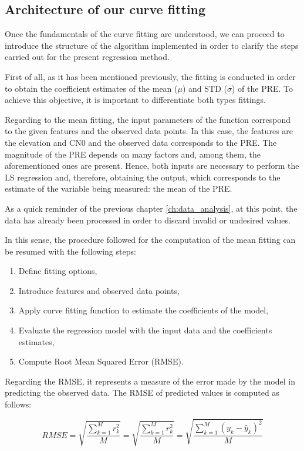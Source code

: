\documentclass[a4paper, report, oneside, UKenglish]{memoir}
\begin{document}
\subsection{Architecture of our curve fitting}

Once the fundamentals of the curve fitting are understood, we can proceed to introduce the structure of the algorithm implemented in order to clarify the steps carried out for the present regression method.

First of all, as it has been mentioned previously, the fitting is conducted in order to obtain the coefficient estimates of the mean ($\mu$) and STD ($\sigma$) of the PRE. To achieve this objective, it is important to differentiate both types fittings. 

Regarding to the mean fitting, the input parameters of the function correspond to the given features and the observed data points. In this case, the features are the elevation and CN0 and the observed data corresponds to the PRE. The magnitude of the PRE depends on many factors and, among them, the aforementioned ones are present. Hence, both inputs are necessary to perform the LS regression and, therefore, obtaining the output, which corresponds to the estimate of the variable being measured: the mean of the PRE.  

As a quick reminder of the previous chapter \ref{ch:data_analysis}, at this point, the data has already been processed in order to discard invalid or undesired values. 

In this sense, the procedure followed for the computation of the mean fitting can be resumed with the following steps:
\begin{enumerate}
    \item Define fitting options,
    \item Introduce features and observed data points,  
    \item Apply curve fitting function to estimate the coefficients of the model,
    \item Evaluate the regression model with the input data and the coefficients estimates,
    \item Compute Root Mean Squared Error (RMSE). 
\end{enumerate}

Regarding the RMSE, it represents a measure of the error made by the model in predicting the observed data. The RMSE of predicted values is computed as follows:

\begin{equation}
    RMSE = \sqrt{\frac{\sum\limits_{k=1}^{M}{r}_{k}^{2}}{M}} = \sqrt{\frac{\sum\limits_{k=1}^{M}{r}_{k}^{2}}{M}} = \sqrt{\frac{\sum\limits_{k=1}^{M}(y_k - \hat{y}_k)^2}{M}} 
\end{equation}
\end{document}
